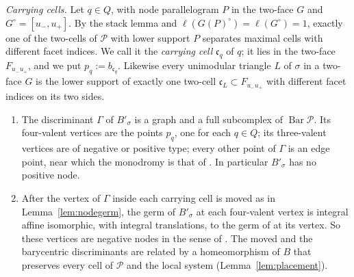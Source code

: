 \emph{Carrying cells.} Let $q\in Q$, with node parallelogram $P$ in the two-face $G$ and $G^\circ=[u_-,u_+]$. By the stack
lemma and $\ell(G(P)^\circ)=\ell(G^\circ)=1$, exactly one of the two-cells of $\mathscr P$ with lower support $P$ separates maximal cells
with different facet indices. We call it the \emph{carrying cell} $\mathfrak c_q$ of $q$; it lies in the two-face
$F_{u_-u_+}$, and we put $p_q:=b_{\mathfrak c_q}$. Likewise every unimodular triangle $L$ of $\sigma$ in a two-face $G$ is the lower
support of exactly one two-cell $\mathfrak c_L\subset F_{u_-u_+}$ with different facet indices on its two sides.

\begin{proposition}\label{prop:base}
\begin{enumerate}
\item The discriminant $\Gamma$ of $B'_\sigma$ is a graph and a full subcomplex of $\operatorname{Bar}\mathscr P$. Its four-valent
vertices are the points $p_q$, one for each $q\in Q$; its three-valent vertices are of negative or positive type; every other
point of $\Gamma$ is an edge point, near which the monodromy is that of \cite[Ex.~2.2]{CBM}. In particular $B'_\sigma$ has no
positive node.
\item After the vertex of $\Gamma$ inside each carrying cell is moved as in Lemma~\ref{lem:nodegerm}, the germ of $B'_\sigma$ at each
four-valent vertex is integral affine isomorphic, with integral translations, to the germ of \cite[Ex.~6.1]{CBM} at its vertex.
So these vertices are negative nodes in the sense of \cite[Def.~6.3]{CBM}. The moved and the barycentric discriminants are
related by a homeomorphism of $B$ that preserves every cell of $\mathscr P$ and the local system (Lemma~\ref{lem:placement}).
\end{enumerate}
\end{proposition}

